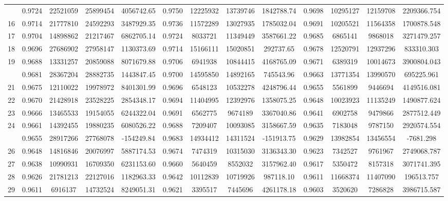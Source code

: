 \documentclass[
  12pt,
]{article}
\begin{document}
\begin{longtable}[t]{lcccccccccccc}
\addlinespace
15 & 0.9724 & 22521059 & 25899454 & 4056742.65 & 0.9750 & 12225932 & 13739746 & 1842788.74 & 0.9698 & 10295127 & 12159708 & 2209366.754\\
16 & 0.9714 & 21777810 & 24592293 & 3487929.35 & 0.9736 & 11572289 & 13027935 & 1785032.04 & 0.9691 & 10205521 & 11564358 & 1700878.548\\
17 & 0.9704 & 14898862 & 21217467 & 6862705.14 & 0.9724 & 8033721 & 11349449 & 3587661.22 & 0.9685 & 6865141 & 9868018 & 3271479.257\\
18 & 0.9696 & 27686902 & 27958147 & 1130373.69 & 0.9714 & 15166111 & 15020851 & 292737.65 & 0.9678 & 12520791 & 12937296 & 833310.303\\
19 & 0.9688 & 13331257 & 20859088 & 8071679.88 & 0.9706 & 6941938 & 10844415 & 4168765.09 & 0.9671 & 6389319 & 10014673 & 3900804.043\\
\addlinespace
20 & 0.9681 & 28367204 & 28882735 & 1443847.45 & 0.9700 & 14595850 & 14892165 & 745543.96 & 0.9663 & 13771354 & 13990570 & 695225.961\\
21 & 0.9675 & 12110022 & 19978972 & 8401301.99 & 0.9696 & 6548123 & 10532278 & 4248796.44 & 0.9655 & 5561899 & 9446694 & 4149516.081\\
22 & 0.9670 & 21428918 & 23528225 & 2854348.17 & 0.9694 & 11404995 & 12392976 & 1358075.25 & 0.9648 & 10023923 & 11135249 & 1490877.624\\
23 & 0.9666 & 13465533 & 19154055 & 6244322.04 & 0.9691 & 6562775 & 9674189 & 3367040.86 & 0.9641 & 6902758 & 9479866 & 2877512.449\\
24 & 0.9661 & 14392455 & 19880235 & 6080526.22 & 0.9688 & 7209407 & 10093085 & 3158667.59 & 0.9635 & 7183048 & 9787150 & 2920574.554\\
\addlinespace
25 & 0.9655 & 28917266 & 27768078 & -154249.84 & 0.9683 & 14934412 & 14311524 & -151913.75 & 0.9629 & 13982854 & 13456554 & -7681.298\\
26 & 0.9648 & 14816846 & 20076997 & 5887174.53 & 0.9674 & 7474319 & 10315030 & 3136343.30 & 0.9623 & 7342527 & 9761967 & 2749068.787\\
27 & 0.9638 & 10990931 & 16709350 & 6231153.60 & 0.9660 & 5640459 & 8552032 & 3157962.40 & 0.9617 & 5350472 & 8157318 & 3071741.395\\
28 & 0.9626 & 21781213 & 22127016 & 1182963.33 & 0.9642 & 10112839 & 10719926 & 987118.10 & 0.9611 & 11668374 & 11407090 & 196513.757\\
29 & 0.9611 & 6916137 & 14732524 & 8249051.31 & 0.9621 & 3395517 & 7445696 & 4261178.18 & 0.9603 & 3520620 & 7286828 & 3986715.587\\

\end{longtable}
\end{document}
